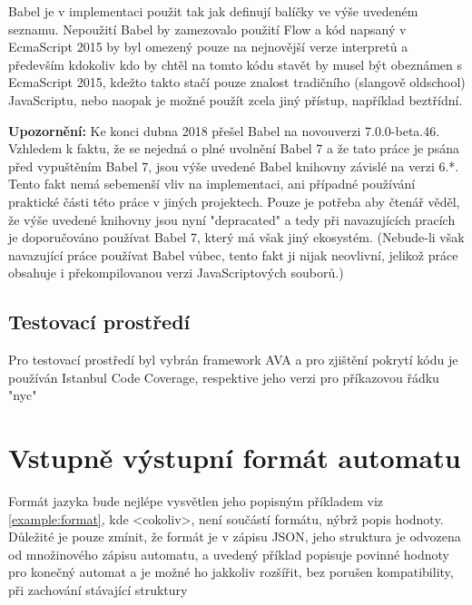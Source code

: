 Babel je v implementaci použit tak jak definují balíčky ve výše uvedeném seznamu. Nepoužití Babel by zamezovalo použití Flow a kód napsaný v EcmaScript 2015 by byl omezený pouze na nejnovější verze interpretů a především kdokoliv kdo by chtěl na tomto kódu stavět by musel být obeznámen s EcmaScript 2015, kdežto takto stačí pouze znalost tradičního (slangově oldschool) JavaScriptu, nebo naopak je možné použít zcela jiný přístup, například beztřídní.

\textbf{Upozornění:} Ke konci dubna 2018 přešel Babel na novouverzi 7.0.0-beta.46. Vzhledem k faktu, že se nejedná o plné uvolnění Babel 7 a že tato práce je psána před vypuštěním Babel 7, jsou výše uvedené Babel knihovny závislé na verzi 6.*. Tento fakt nemá sebemenší vliv na implementaci, ani případné používání praktické části této práce v jiných projektech. Pouze je potřeba aby čtenář věděl, že výše uvedené knihovny jsou nyní "depracated" a tedy při navazujících pracích je doporučováno používat Babel 7, který má však jiný ekosystém. (Nebude-li však navazující práce používat Babel vůbec, tento fakt ji nijak neovlivní, jelikož práce obsahuje i překompilovanou verzi JavaScriptových souborů.)

\subsection{Testovací prostředí}
Pro testovací prostředí byl vybrán framework AVA \cite{ava} a pro zjištění pokrytí kódu je používán Istanbul Code Coverage\cite{instambul}, respektive jeho verzi pro příkazovou řádku "nyc" \cite{nyc}



\section{Vstupně výstupní formát automatu}
Formát jazyka bude nejlépe vysvětlen jeho popisným příkladem viz \ref{example:format}, kde <cokoliv>, není součástí formátu, nýbrž popis hodnoty. Důležité je pouze zmínit, že formát je v zápisu JSON, jeho struktura je odvozena od množinového zápisu automatu, a uvedený příklad popisuje povinné hodnoty pro konečný automat a je možné ho jakkoliv rozšířit, bez porušen kompatibility, při zachování stávající struktury

